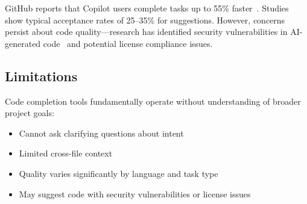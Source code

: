 GitHub reports that Copilot users complete tasks up to 55\% faster~\citep{peng2023impact}. Studies show typical acceptance rates of 25--35\% for suggestions. However, concerns persist about code quality---research has identified security vulnerabilities in AI-generated code~\citep{pearce2022asleep} and potential license compliance issues.

\subsection{Limitations}

Code completion tools fundamentally operate without understanding of broader project goals:
\begin{itemize}
    \item Cannot ask clarifying questions about intent
    \item Limited cross-file context
    \item Quality varies significantly by language and task type
    \item May suggest code with security vulnerabilities or license issues
\end{itemize}
